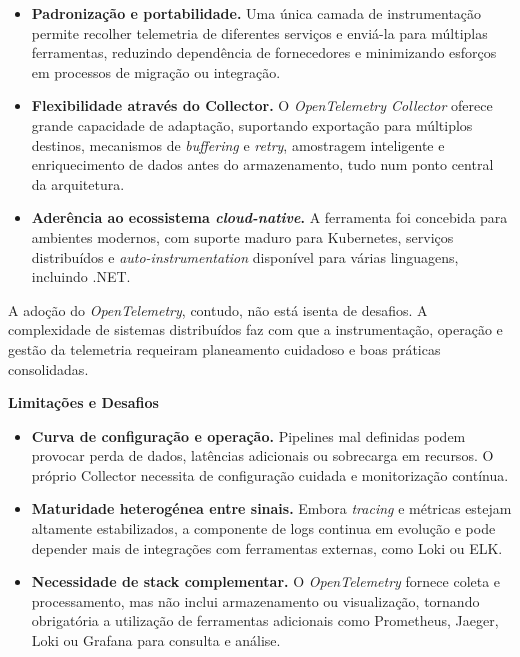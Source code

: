 \begin{itemize}
    \item \textbf{Padronização e portabilidade.} Uma única camada de instrumentação permite recolher telemetria de diferentes serviços e enviá-la para múltiplas ferramentas, reduzindo dependência de fornecedores e minimizando esforços em processos de migração ou integração.
    
    \item \textbf{Flexibilidade através do Collector.} O \textit{OpenTelemetry Collector} oferece grande capacidade de adaptação, suportando exportação para múltiplos destinos, mecanismos de \textit{buffering} e \textit{retry}, amostragem inteligente e enriquecimento de dados antes do armazenamento, tudo num ponto central da arquitetura.
    
    \item \textbf{Aderência ao ecossistema \textit{cloud-native}.} A ferramenta foi concebida para ambientes modernos, com suporte maduro para Kubernetes, serviços distribuídos e \textit{auto-instrumentation} disponível para várias linguagens, incluindo .NET.
\end{itemize}

A adoção do \textit{OpenTelemetry}, contudo, não está isenta de desafios. A complexidade de sistemas distribuídos faz com que a instrumentação, operação e gestão da telemetria requeiram planeamento cuidadoso e boas práticas consolidadas.

\textbf{Limitações e Desafios}

\begin{itemize}
    \item \textbf{Curva de configuração e operação.} Pipelines mal definidas podem provocar perda de dados, latências adicionais ou sobrecarga em recursos. O próprio Collector necessita de configuração cuidada e monitorização contínua.
    
    \item \textbf{Maturidade heterogénea entre sinais.} Embora \textit{tracing} e métricas estejam altamente estabilizados, a componente de logs continua em evolução e pode depender mais de integrações com ferramentas externas, como Loki ou ELK.
    
    \item \textbf{Necessidade de stack complementar.} O \textit{OpenTelemetry} fornece coleta e processamento, mas não inclui armazenamento ou visualização, tornando obrigatória a utilização de ferramentas adicionais como Prometheus, Jaeger, Loki ou Grafana para consulta e análise.
\end{itemize}


